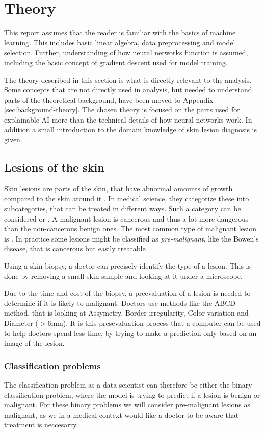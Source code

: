 \chapter{Theory}
This report assumes that the reader is familiar with the basics of machine learning.
This includes basic linear algebra, data preprocessing and model selection.
Further, understanding of how neural networks function is assumed,
including the basic concept of gradient descent used for model training.

The theory described in this section is what is directly relevant to the analysis.
Some concepts that are not directly used in analysis,
but needed to understand parts of the theoretical background,
have been moved to Appendix \ref{sec:background-theory}.
The chosen theory is focused on the parts used for explainable AI more than the technical details of how neural networks work.
In addition a small introduction to the domain knowledge of skin lesion diagnosis is given.

\section{Lesions of the skin}
Skin lesions are parts of the skin,
that have abnormal amounts of growth compared to the skin around it \cite{dermatologi-laerebogen}.
In medical science, they categorize these into subcategories,
that can be treated in different ways.
Such a category can be considered  or .
A malignant lesion is cancerous and thus a lot more dangerous than the non-cancerous benign ones. 
The most common type of malignant lesion is . 
In practice some lesions might be classified as \textit{pre-malignant},
like the Bowen's disease,
that is cancerous but easily treatable \cite{nhs-bowens-disease}.

Using a skin biopsy,
a doctor can precisely identify the type of a lesion.
This is done by removing a small skin sample and looking at it under a microscope.

Due to the time and cost of the biopsy,
a preevaluation of a lesion is needed to determine if it is likely to malignant.
Doctors use methods like the ABCD method,
that is looking at Assymetry, Border irregularity, Color variation and Diameter ($>6\text{mm}$)\cite{dermatologi-laerebogen}.
It is this presevaluation process that a computer can be used to help doctors spend less time,
by trying to make a prediction only based on an image of the lesion.

\subsection{Classification problems}\label{sec:classification-problems}
The classification problem as a data scientist can therefore be either the binary classification problem,
where the model is trying to predict if a lesion is benign or malignant.
For these binary problems we will consider pre-malignant lesions as malignant,
as we in a medical context would like a doctor to be aware that treatment is neccesarry.

